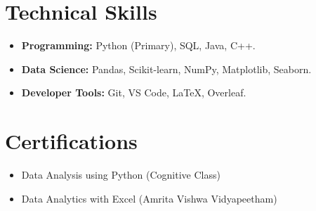 \documentclass[11pt,a4paper]{article}
\begin{document}
\section{Technical Skills}
\begin{itemize}[label=--]
    \item \textbf{Programming:} Python (Primary), SQL, Java, C++.
    \item \textbf{Data Science:} Pandas, Scikit-learn, NumPy, Matplotlib, Seaborn.
    \item \textbf{Developer Tools:} Git, VS Code, LaTeX, Overleaf.
\end{itemize}

\section{Certifications}
\begin{itemize}[label=--]
    \item Data Analysis using Python (Cognitive Class)
    \item Data Analytics with Excel (Amrita Vishwa Vidyapeetham)
\end{itemize}
\end{document}

